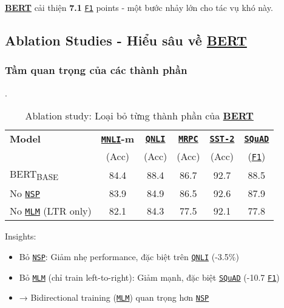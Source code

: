 \hyperref[acro:bert]{\textbf{BERT}} cải thiện \textbf{7.1} \hyperref[acro:f1]{\texttt{F1}} points - một bước nhảy lớn cho tác vụ khó này.
\subsection{Ablation Studies - Hiểu sâu về \hyperref[acro:bert]{\textbf{BERT}} \cite{devlin2018bert}}
\label{ssec:ablation_study_bert}

\subsubsection{Tầm quan trọng của các thành phần}
\begin{table}[H]
    \centering
    \caption{Ablation study: Loại bỏ từng thành phần của \hyperref[acro:bert]{\textbf{BERT}} \cite{devlin2018bert}}.
    \label{tab:ablation_components}
    \begin{tabular}{lccccc}
        \toprule
        \textbf{Model} & \textbf{\hyperref[acro:mnli]{\texttt{MNLI}}-m} & \textbf{\hyperref[acro:qnli]{\texttt{QNLI}}} & \textbf{\hyperref[acro:mrpc]{\texttt{MRPC}}} & \textbf{\hyperref[acro:sst2]{\texttt{SST-2}}} & \textbf{\hyperref[acro:squad]{\texttt{SQuAD}}} \\
        & (Acc) & (Acc) & (Acc) & (Acc) & (\hyperref[acro:f1]{\texttt{F1}}) \\
        \midrule
        BERT\textsubscript{BASE} & 84.4
        & 88.4 & 86.7 & 92.7 & 88.5 \\
        \midrule
        No \hyperref[acro:nsp]{\texttt{NSP}} & 83.9 & 84.9 & 86.5 & 92.6 & 87.9 \\
        No \hyperref[acro:mlm]{\texttt{MLM}} (LTR only) & 82.1 & 84.3 & 77.5 & 92.1 & 77.8 \\
        \bottomrule
    \end{tabular}
\end{table}

Insights:
\begin{itemize}
    \item Bỏ \hyperref[acro:nsp]{\texttt{NSP}}: Giảm nhẹ performance, đặc biệt trên \hyperref[acro:qnli]{\texttt{QNLI}} (-3.5\%)
    \item Bỏ \hyperref[acro:mlm]{\texttt{MLM}} (chỉ train left-to-right): Giảm mạnh, đặc biệt \hyperref[acro:squad]{\texttt{SQuAD}} (-10.7
    \hyperref[acro:f1]{\texttt{F1}})
    \item → Bidirectional training (\hyperref[acro:mlm]{\texttt{MLM}}) quan trọng hơn \hyperref[acro:nsp]{\texttt{NSP}}
\end{itemize}


